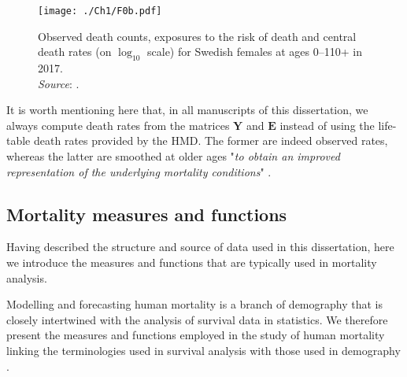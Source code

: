 \documentclass[Thesis]{subfiles}
\begin{document}
\begin{figure}[!ht]
	\begin{center}
		\texttt{[image: ./Ch1/F0b.pdf]}
		\caption{Observed death counts, exposures to the risk of death and central death rates (on $\log_{10}$ scale) for Swedish females at ages 0--110+ in 2017.\\
		\textit{Source}: \cite{HMD}.}\label{Fig:Ch1Data}
	\end{center}
\end{figure} 

It is worth mentioning here that, in all manuscripts of this dissertation, we always compute death rates from the matrices $\bm{Y}$ and $\bm{E}$ instead of using the life-table death rates provided by the HMD. The former are indeed observed rates, whereas the latter are smoothed at older ages "\textit{to obtain an improved representation of the underlying mortality conditions}" \cite[][p.~34]{wilmoth2019protocol}.

\subsection*{Mortality measures and functions}\label{Subsec:Ch1subsec1.2}
Having described the structure and source of data used in this dissertation, here we introduce the measures and functions that are typically used in mortality analysis. 

Modelling and forecasting human mortality is a branch of demography that is closely intertwined with the analysis of survival data in statistics. We therefore present the measures and functions employed in the study of human mortality linking the terminologies used in survival analysis \cite[derived from][]{klein2003survival} with those used in demography \cite[derived from][]{preston2001demogr}.
\end{document}
